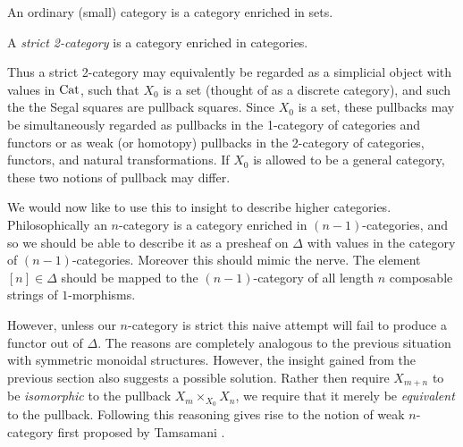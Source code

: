 \documentclass{amsart}
\begin{document}
\begin{example}
	An ordinary (small) category is a category enriched in sets.
\end{example}

\begin{example}
	A {\em strict 2-category} is a category enriched in categories.
\end{example}

Thus a strict 2-category may equivalently be regarded as a simplicial object with values in $\mathrm{Cat}$, such that $X_0$ is a set (thought of as a discrete category), and such the the Segal squares are pullback squares. Since $X_0$ is a set, these pullbacks may be simultaneously regarded as pullbacks in the 1-category of categories and functors or as weak (or homotopy) pullbacks in the 2-category of categories, functors, and natural transformations. If $X_0$ is allowed to be a general category, these two notions of pullback may differ. 



We would now like to use this to insight to describe higher categories. Philosophically an $n$-category is a category enriched in $(n-1)$-categories, and so we should be able to describe it as a presheaf on $\Delta$ with values in the category of $(n-1)$-categories. Moreover this should mimic the nerve. The element $[n] \in \Delta$ should be mapped to the $(n-1)$-category of all length $n$ composable strings of $1$-morphisms. 

However, unless our $n$-category is strict this naive attempt will fail to produce a functor out of $\Delta$. The reasons are completely analogous to the previous situation with symmetric monoidal structures. However, the insight gained from the previous section also suggests a possible solution. Rather then require $X_{m+n}$ to be {\em isomorphic} to the pullback $X_m \times_{X_0} X_n$, we require that it merely be {\em equivalent} to the pullback. 
Following this reasoning gives rise to the notion of weak $n$-category first proposed by Tamsamani \cite{Tamsamani:thesis}.   
\end{document}
